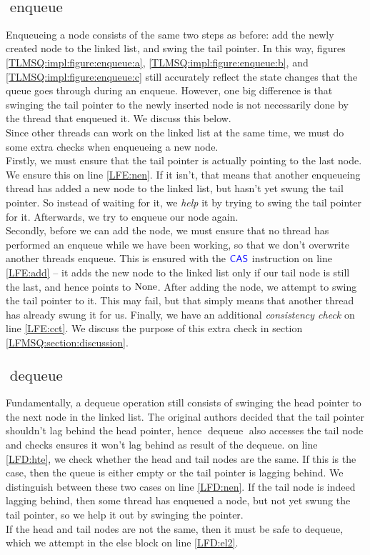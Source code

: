 \documentclass[a4paper, 11pt]{report}
\newcommand{\enqueue}{\operatorname{enqueue}}
\newcommand{\dequeue}{\operatorname{dequeue}}
\begin{document}
\subsection[Enqueue]{$\enqueue$}
Enqueueing a node consists of the same two steps as before: add the newly created node to the linked list, and swing the tail pointer. In this way, figures \ref{TLMSQ:impl:figure:enqueue:a}, \ref{TLMSQ:impl:figure:enqueue:b}, and \ref{TLMSQ:impl:figure:enqueue:c} still accurately reflect the state changes that the queue goes through during an enqueue. However, one big difference is that swinging the tail pointer to the newly inserted node is not necessarily done by the thread that enqueued it. We discuss this below.\\
Since other threads can work on the linked list at the same time, we must do some extra checks when enqueueing a new node.\\
Firstly, we must ensure that the tail pointer is actually pointing to the last node. We ensure this on line \ref{LFE:nen}. If it isn't, that means that another enqueueing thread has added a new node to the linked list, but hasn't yet swung the tail pointer. So instead of waiting for it, we \textit{help} it by trying to swing the tail pointer for it. Afterwards, we try to enqueue our node again.\\
Secondly, before we can add the node, we must ensure that no thread has performed an enqueue while we have been working, so that we don't overwrite another threads enqueue. This is ensured with the $\textsf{\color{blue} CAS}$ instruction on line \ref{LFE:add} -- it adds the new node to the linked list only if our tail node is still the last, and hence points to $\operatorname{None}$. After adding the node, we attempt to swing the tail pointer to it. This may fail, but that simply means that another thread has already swung it for us.
Finally, we have an additional \textit{consistency check} on line \ref{LFE:cct}. We discuss the purpose of this extra check in section \ref{LFMSQ:section:discussion}.

\subsection[Dequeue]{$\dequeue$}
Fundamentally, a dequeue operation still consists of swinging the head pointer to the next node in the linked list. The original authors decided that the tail pointer shouldn't lag behind the head pointer, hence $\dequeue$ also accesses the tail node and checks ensures it won't lag behind as result of the dequeue. on line \ref{LFD:hte}, we check whether the head and tail nodes are the same. If this is the case, then the queue is either empty or the tail pointer is lagging behind. We distinguish between these two cases on line \ref{LFD:nen}. If the tail node is indeed lagging behind, then some thread has enqueued a node, but not yet swung the tail pointer, so we help it out by swinging the pointer.\\
If the head and tail nodes are not the same, then it must be safe to dequeue, which we attempt in the else block on line \ref{LFD:el2}.
\end{document}
